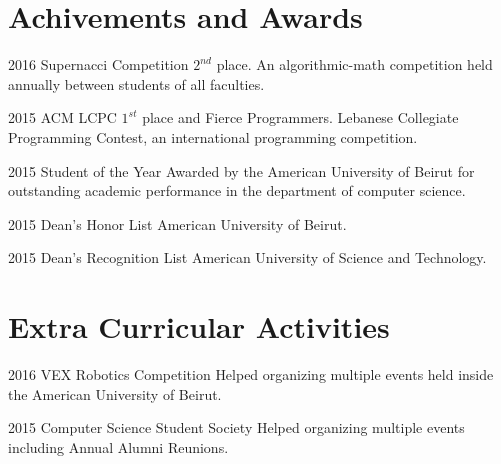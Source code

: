 \documentclass{tccv}
\begin{document}
\section{Achivements and Awards}

\begin{yearlist}

\item{2016}
     {Supernacci Competition}
     {$2^{nd}$ place. An algorithmic-math competition held annually between students of all faculties.}

\item{2015}
     {ACM LCPC}
     {$1^{st}$ place and Fierce Programmers. Lebanese Collegiate Programming Contest, an international programming competition.}

\item{2015}
     {Student of the Year}
     {Awarded by the American University of Beirut for outstanding academic performance in the department of computer science.}

\item{2015}
     {Dean's Honor List}
     {American University of Beirut.}

\item{2015}
     {Dean's Recognition List}
     {American University of Science and Technology.}

\end{yearlist}

\section{Extra Curricular Activities}
\begin{yearlist}
\item{2016}
     {VEX Robotics Competition}
     {Helped organizing multiple events held inside the American University of Beirut.}


\item{2015}
     {Computer Science Student Society}
     {Helped organizing multiple events including Annual Alumni Reunions.}

\end{yearlist}
\end{document}
